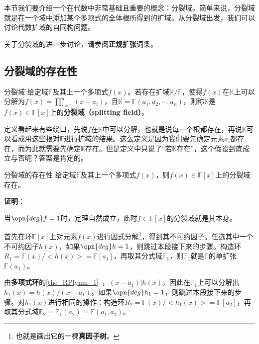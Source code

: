 


本节我们要介绍一个在代数中非常基础且重要的概念：分裂域。简单来说，分裂域就是在一个域中添加某个多项式的全体根所得到的扩域。从分裂域出发，我们可以讨论代数扩域的自同构问题。

关于分裂域的进一步讨论，请参阅\textbf{正规扩张}词条。


\subsection{分裂域的存在性}


\begin{definition}{分裂域}
给定域$\mathbb{F}$及其上一个多项式$f(x)$。若存在扩域$\mathbb{K}/\mathbb{F}$，使得$f(x)$在$\mathbb{K}$上可以分解为$f(x)=\prod_{i=1}^n (x-a_i)$，且$\mathbb{K}=\mathbb{F}(a_1, a_2, \cdots, a_n)$，则称$\mathbb{K}$是$f(x)\in \mathbb{F}[x]$上的\textbf{分裂域（splitting field）}。
\end{definition}

定义看起来有些绕口，先说$f$在$\mathbb{K}$中可以分解，也就是说每一个根都存在，再说$\mathbb{K}$可以看成用这些根对$\mathbb{F}$进行扩域的结果。这么定义是因为我们要先确定元素$a_i$都存在，而为此就需要先确定$\mathbb{K}$存在。但是定义中只说了“若$\mathbb{K}$存在”，这个假设到底成立与否呢？答案是肯定的。

\begin{theorem}{分裂域的存在性}
给定域$\mathbb{F}$及其上一个多项式$f(x)$，则$f(x)\in \mathbb{F}[x]$上的分裂域存在。
\end{theorem}

\textbf{证明}：

当$\opn{deg}f=1$时，定理自然成立，此时$f\in\mathbb{F}[x]$的分裂域就是其本身。

首先在环$\mathbb{F}[x]$上对元素$f(x)$进行因式分解\footnote{也就是画出它的一棵\textbf{真因子树}。}，得到其不可约因子。任选其中一个不可约因子$h(x)$，如果$\opn{deg} h = 1$，则跳过本段接下来的步骤。构造环$R_1=\mathbb{F}(x)/<h(x)>=\mathbb{F}[a_1]$，再取其分式域$\mathbb{F}_1$，则$\mathbb{F}_1$就是$\mathbb{F}$的单扩张$\mathbb{F}(a_1)$。

由\textbf{多项式环}的\autoref{the_RPlynm_1}~，$(x-a_1)|h(x)$，因此在$\mathbb{F}_1$上可以分解出$h_1(x)=h(x)/(x-a_1)$。如果$\opn{deg}h_1 = 1$，则跳过本段接下来的步骤。对$h_1(x)$进行相同的操作：构造环$R_2=\mathbb{F}(x)/<h_1(x)>=\mathbb{F}[a_2]$，再取其分式域$\mathbb{F}_2=\mathbb{F}_1(a_2)=\mathbb{F}(a_1, a_2)$。

